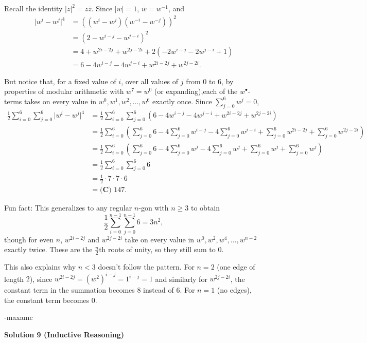 \begin{enumerate}
 Recall the identity $|z|^2 = z\overline{z}$. Since $|w| = 1$, $\overline{w} = w^{-1}$, and
 \begin{align*}     \lvert w^i-w^j\rvert^4 &= ((w^i-w^j)(w^{-i}-w^{-j}))^2 \\     &= (2-w^{i-j}-w^{j-i})^2 \\     &= 4+w^{2i-2j}+w^{2j-2i}+2(-2w^{i-j}-2w^{j-i}+1) \\     &= 6-4w^{i-j}-4w^{j-i}+w^{2i-2j}+w^{2j-2i}. \end{align*}


 But notice that, for a fixed value of $i$, over all values of $j$ from $0$ to $6$, by properties of modular arithmetic with $w^7 = w^0$ (or expanding),each of the $w^\bullet$-terms takes on every value in $w^0,w^1,w^2,\dots,w^6$ exactly once. Since $\sum_{j=0}^6 w^j = 0$,
 \begin{align*}     \frac{1}{2}\sum_{i=0}^6\sum_{j=0}^6\lvert w^i-w^j\rvert^4 &= \frac{1}{2}\sum_{i=0}^6\sum_{j=0}^6(6-4w^{i-j}-4w^{j-i}+w^{2i-2j}+w^{2j-2i}) \\     &= \frac{1}{2}\sum_{i=0}^6\left(\sum_{j=0}^6 6-4\sum_{j=0}^6 w^{i-j}-4\sum_{j=0}^6 w^{j-i}+\sum_{j=0}^6 w^{2i-2j}+\sum_{j=0}^6 w^{2j-2i}\right) \\     &= \frac{1}{2}\sum_{i=0}^6\left(\sum_{j=0}^6 6-4\sum_{j=0}^6 w^j-4\sum_{j=0}^6 w^j+\sum_{j=0}^6 w^j+\sum_{j=0}^6 w^j\right) \\     &= \frac{1}{2}\sum_{i=0}^6\sum_{j=0}^6 6 \\     &= \frac{1}{2}\cdot7\cdot7\cdot6 \\     &= \boxed{\textbf{(C) }147}. \end{align*}


 Fun fact: This generalizes to any regular $n$-gon with $n \ge 3$ to obtain
 \[\frac{1}{2}\sum_{i=0}^{n-1}\sum_{j=0}^{n-1}6 = 3n^2,\]though for even $n$, $w^{2i-2j}$ and $w^{2j-2i}$ take on every value in $w^0,w^2,w^4,\dots,w^{n-2}$ exactly twice. These are the $\frac{n}{2}$th roots of unity, so they still sum to $0$.

 This also explains why $n < 3$ doesn't follow the pattern. For $n = 2$ (one edge of length $2$), since $w^{2i-2j} = (w^2)^{i-j} = 1^{i-j} = 1$ and similarly for $w^{2j-2i}$, the constant term in the summation becomes $8$ instead of $6$. For $n = 1$ (no edges), the constant term becomes $0$.

 -maxamc

 



\textbf{Solution 9 (Inductive Reasoning)}


\end{enumerate}

